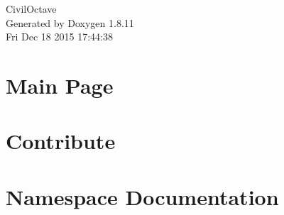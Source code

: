 \documentclass[twoside]{book}
\newcommand{\+}{\discretionary{\mbox{\scriptsize$\hookleftarrow$}}{}{}}
\newcommand{\clearemptydoublepage}{%
  \newpage{\pagestyle{empty}\cleardoublepage}%
}
\begin{document}
\hypersetup{pageanchor=false,
             bookmarks=true,
             bookmarksnumbered=true,
             pdfencoding=unicode
            }
\begin{titlepage}
\vspace*{7cm}
\begin{center}%
{\Large Civil\+Octave }\\
\vspace*{1cm}
{\large Generated by Doxygen 1.8.11}\\
\vspace*{0.5cm}
{\small Fri Dec 18 2015 17:44:38}\\
\end{center}
\end{titlepage}
\clearemptydoublepage
\tableofcontents
\clearemptydoublepage
{}
\hypersetup{pageanchor=true}

\chapter{Main Page}
\label{index}\hypertarget{index}{}
\chapter{Contribute}
\label{md__home_amarjeet_projects_CivilOctave_sage_Contribute}
\hypertarget{md__home_amarjeet_projects_CivilOctave_sage_Contribute}{}

\chapter{Namespace Documentation}

















\end{document}

